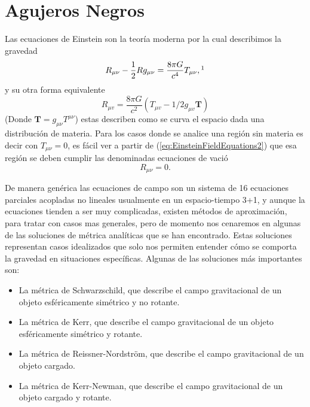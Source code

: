 \chapter{Agujeros Negros}

Las ecuaciones de Einstein son la teoría moderna por la cual describimos la gravedad
\begin{equation}
    R_{\mu \nu}-\frac{1}{2} R g_{\mu \nu} = \frac{8 \pi G}{c^4} T_{\mu \nu},\footnotemark
    \label{EinsteinFieldEquations}
\end{equation}
y su otra forma equivalente 
\begin{equation}
    R_{\mu v}=\frac{8 \pi G}{c^2}\left(T_{\mu v}-1 / 2 g_{\mu v} \mathbf{T}\right) 
    \label{eq:EinsteinFieldEquations2}    
\end{equation}
(Donde $\mathbf{T} = g_{\mu\nu}T^{\mu\nu}$)
estas describen como se curva el espacio dada una distribución de materia. Para los casos donde se analice una región sin materia es decir con $T_{\mu\nu}=0$, es fácil ver a partir de (\ref{eq:EinsteinFieldEquations2}) que esa región se deben cumplir las denominadas ecuaciones de vació 
\begin{equation}
    R_{\mu \nu} = 0.
    \label{vacuumFieldEquations}
\end{equation}

De manera genérica las ecuaciones de campo son un sistema de 16 ecuaciones parciales acopladas no lineales usualmente en un espacio-tiempo 3+1,  y aunque la ecuaciones tienden a ser muy complicadas, existen métodos de aproximación, para tratar con casos mas generales, pero de momento nos cenaremos en algunas de las  soluciones de métrica analíticas que se han encontrado. Estas soluciones representan casos idealizados que solo  nos permiten entender cómo se comporta la gravedad en situaciones específicas. Algunas de las soluciones más importantes son:

\begin{itemize}
    \item La métrica de Schwarzschild, que describe el campo gravitacional de un objeto esféricamente simétrico y no rotante.
    \item La métrica de Kerr, que describe el campo gravitacional de un objeto esféricamente simétrico y rotante.
    \item La métrica de Reissner-Nordström, que describe el campo gravitacional de un objeto cargado.
    \item La métrica de Kerr-Newman, que describe el campo gravitacional de un objeto cargado y rotante.
\end{itemize}


